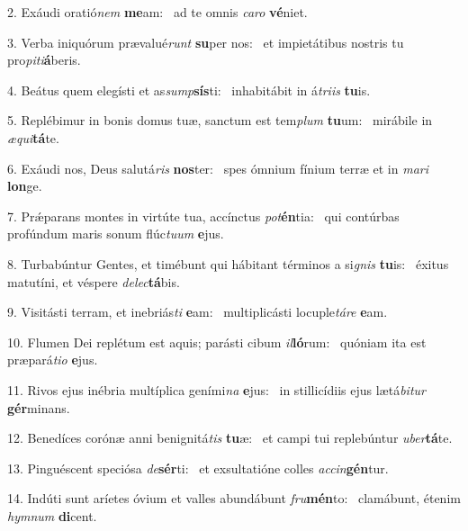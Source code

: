 2. Exáudi oratió\textit{nem} \textbf{me}am: \ast\  ad te omnis \textit{ca}\textit{ro} \textbf{vé}niet.\

3. Verba iniquórum prævalué\textit{runt} \textbf{su}per nos: \ast\  et impietátibus nostris tu pro\textit{pi}\textit{ti}\textbf{á}beris.\

4. Beátus quem elegísti et as\textit{sump}\textbf{sís}ti: \ast\  inhabitábit in á\textit{tri}\textit{is} \textbf{tu}is.\

5. Replébimur in bonis domus tuæ, sanctum est tem\textit{plum} \textbf{tu}um: \ast\  mirábile in \textit{æ}\textit{qui}\textbf{tá}te.\

6. Exáudi nos, Deus salutá\textit{ris} \textbf{nos}ter: \ast\  spes ómnium fínium terræ et in \textit{ma}\textit{ri} \textbf{lon}ge.\

7. Prǽparans montes in virtúte tua, accínctus \textit{pot}\textbf{én}tia: \ast\  qui contúrbas profúndum maris sonum flúc\textit{tu}\textit{um} \textbf{e}jus.\

8. Turbabúntur Gentes, et timébunt qui hábitant términos a si\textit{gnis} \textbf{tu}is: \ast\  éxitus matutíni, et véspere \textit{de}\textit{lec}\textbf{tá}bis.\

9. Visitásti terram, et inebriás\textit{ti} \textbf{e}am: \ast\  multiplicásti locuple\textit{tá}\textit{re} \textbf{e}am.\

10. Flumen Dei replétum est aquis; parásti cibum \textit{il}\textbf{ló}rum: \ast\  quóniam ita est præpará\textit{ti}\textit{o} \textbf{e}jus.\

11. Rivos ejus inébria multíplica geními\textit{na} \textbf{e}jus: \ast\  in stillicídiis ejus lætá\textit{bi}\textit{tur} \textbf{gér}minans.\

12. Benedíces corónæ anni benignitá\textit{tis} \textbf{tu}æ: \ast\  et campi tui replebúntur \textit{u}\textit{ber}\textbf{tá}te.\

13. Pinguéscent speciósa \textit{de}\textbf{sér}ti: \ast\  et exsultatióne colles \textit{ac}\textit{cin}\textbf{gén}tur.\

14. Indúti sunt aríetes óvium et valles abundábunt \textit{fru}\textbf{mén}to: \ast\  clamábunt, étenim \textit{hym}\textit{num} \textbf{di}cent.\

